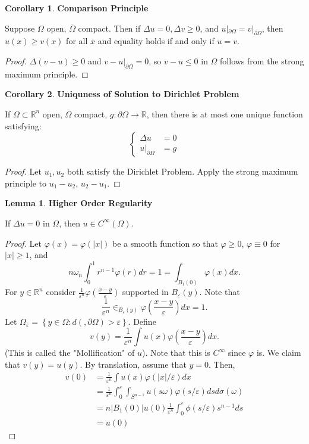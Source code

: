 \documentclass[12pt, a4paper]{article}
\theoremstyle{definition}
\newtheorem{lemma}{Lemma}
\newtheorem{cor}{Corollary}
\newcommand{\R}{\mathbb{R}}                           %
\newcommand{\bd}{\partial}
\newcommand{\ep}{\varepsilon}
\newcommand{\ol}{\overline}
\begin{document}
\begin{tcolorbox}
\begin{cor}
	\textbf{Comparison Principle}
\end{cor}
	Suppose $\Omega$ open, $\ol{\Omega}$ compact. Then if $\Delta u = 0, \Delta v \geq 0$, and 
$u|_{\bd \Omega} = v|_{\bd \Omega}$, then $u(x) \geq v(x)$ for all $x$ and equality holds if and only if $u = v$. 
\end{tcolorbox}
\begin{proof}
	$\Delta (v-u) \geq 0$ and $v-u|_{\bd \Omega} = 0$, so $v-u \leq 0$ in $\Omega$ follows from the strong maximum principle. 
\end{proof}
\begin{tcolorbox}
\begin{cor}
	\textbf{Uniquness of Solution to Dirichlet Problem}
\end{cor}
	If $\Omega \subset \R^n$ open, $\ol{\Omega}$ compact, $g: \bd \Omega \to \R$, then there is at most one unique function satisfying:
	$$ \begin{cases}
		\Delta u & = 0
		\\ u|_{\bd \Omega} & = g
	\end{cases} $$ 
\end{tcolorbox}
\begin{proof}
Let $u_1, u_2$ both satisfy the Dirichlet Problem. Apply the strong maximum principle to $u_1-u_2$, 
$u_2-u_1$. 
\end{proof}
\begin{tcolorbox}
\begin{lemma}
	\textbf{Higher Order Regularity}
\end{lemma}
	If $\Delta u =0$ in $\Omega$, then $u \in C^\infty (\Omega)$. 
\end{tcolorbox}
\begin{proof}
	Let $\varphi(x) = \varphi(|x|)$ be a smooth function so that $\varphi \geq 0$, $\varphi \equiv 0$ for $|x|\geq 1$, and 
	$$ n \omega_n \int_0^1 r^{n-1} \varphi(r) dr = 1 = \int_{B_1(0)} \varphi(x) dx. $$ 
	For $y\in \R^n$ consider $ \frac{ 1 }{ \ep^n } \varphi \left( \frac{ x-y }{ \ep } \right)$ supported in $B_\ep (y)$. Note that 
	$$ \frac{ 1 }{ \ep^n  }\in_{B_\ep (y)} \varphi \left( \frac{ x-y }{ \ep } \right)dx = 1. $$ 
	Let $\Omega_\ep = \left\{ y\in \Omega : d(, \bd \Omega) > \ep \right\}$. 
	Define 
	$$ v(y) = \frac{ 1 }{ \ep^n  }\int u(x) \varphi \left( \frac{ x-y }{ \ep }  \right)dx. $$ 
(This is called the "Mollification" of $u$). Note that this is $C^\infty$ since $\varphi$ is. 
	We claim that $v(y) = u(y)$. By translation, assume that $y=0$. 
	Then, 
	\begin{align*}
		v(0) & = \frac{ 1 }{ \ep^n  }\int u(x) \varphi (|x|/\ep) dx
		\\ & = \frac{ 1 }{ \ep^n } \int_0^\ep \int_{S^{n-1}} u(s \omega) \varphi(s/\ep) ds d\sigma(\omega)
		\\ & = n|B_1(0)| u(0) \frac{ 1 }{ \ep^n  }\int_0^\ep \phi (s/\ep)s^{n-1} ds \tag{Mean Value Property}
		\\ & = u(0) \tag{by definition of $\varphi$}
	\end{align*}
\end{proof}
\end{document}
